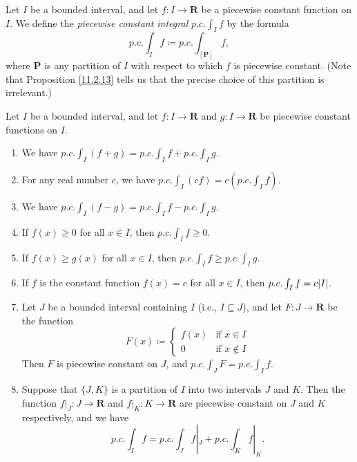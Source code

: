 \begin{definition}\label{11.2.14}
    Let \(I\) be a bounded interval, and let \(f : I \to \mathbf{R}\) be a piecewise constant function on \(I\).
    We define the \emph{piecewise constant integral} \(p.c. \int_I f\) by the formula
    \[
        p.c. \int_I f \coloneqq p.c. \int_{[\mathbf{P}]} f,
    \]
    where \(\mathbf{P}\) is any partition of \(I\) with respect to which \(f\) is piecewise constant.
    (Note that Proposition \ref{11.2.13} tells us that the precise choice of this partition is irrelevant.)
\end{definition}

\setcounter{theorem}{15}
\begin{theorem}\label{11.2.16}
    Let \(I\) be a bounded interval, and let \(f : I \to \mathbf{R}\) and \(g : I \to \mathbf{R}\) be piecewise constant functions on \(I\).
    \begin{enumerate}
        \item We have \(p.c. \int_I (f + g) = p.c. \int_I f + p.c. \int_I g\).
        \item For any real number \(c\), we have \(p.c. \int_I (cf) = c (p.c. \int_I f)\).
        \item We have \(p.c. \int_I (f - g) = p.c. \int_I f - p.c. \int_I g\).
        \item If \(f(x) \geq 0\) for all \(x \in I\), then \(p.c. \int_I f \geq 0\).
        \item If \(f(x) \geq g(x)\) for all \(x \in I\), then \(p.c. \int_I f \geq p.c. \int_I g\).
        \item If \(f\) is the constant function \(f(x) = c\) for all \(x \in I\), then \(p.c. \int_I f = c \abs*{I}\).
        \item Let \(J\) be a bounded interval containing \(I\) (i.e., \(I \subseteq J\)), and let \(F : J \to \mathbf{R}\) be the function
              \[
                  F(x) \coloneqq \begin{cases}
                      f(x) & \text{if } x \in I    \\
                      0    & \text{if } x \notin I
                  \end{cases}
              \]
              Then \(F\) is piecewise constant on \(J\), and \(p.c. \int_J F = p.c. \int_I f\).
        \item Suppose that \(\{J, K\}\) is a partition of \(I\) into two intervals \(J\) and \(K\).
              Then the function \(f|_J : J \to \mathbf{R}\) and \(f|_K : K \to \mathbf{R}\) are piecewise constant on \(J\) and \(K\) respectively, and we have
              \[
                  p.c. \int_I f = p.c. \int_J f|_J + p.c. \int_K f|_K.
              \]
    \end{enumerate}
\end{theorem}

